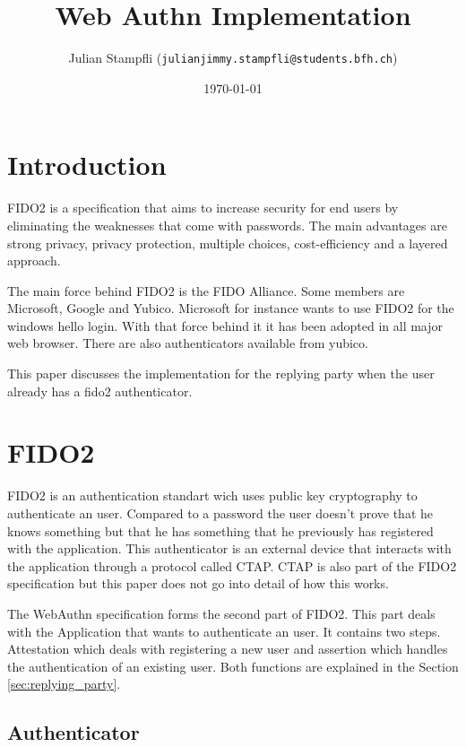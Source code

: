 \documentclass[a4paper, 11pt]{scrartcl}
\begin{document}
\title{Web Authn Implementation}
\date{\today} 
\author{ Julian Stampfli (\texttt{julianjimmy.stampfli@students.bfh.ch}) }
\maketitle
\setcounter{tocdepth}{2}
\tableofcontents
\clearpage

\section{Introduction}

FIDO2 is a specification that aims to increase security for end users by eliminating the weaknesses that come with passwords. The main advantages are strong privacy, privacy protection, multiple choices, cost-efficiency and a layered approach. \cite{yubico:whatIsFido2} 

The main force behind FIDO2 is the FIDO Alliance. Some members are Microsoft, Google and Yubico. Microsoft for instance wants to use FIDO2 for the windows hello login. \cite{yubico:ms} With that force behind it it has been adopted in all major web browser. \cite{fido:browser} There are also authenticators available from yubico. \cite{yubico:yubikey5}

This paper discusses the implementation for the replying party when the user already has a fido2 authenticator.

\section{FIDO2}

FIDO2 is an authentication standart wich uses public key cryptography to authenticate an user. Compared to a password the user doesn't prove that he knows something but that he has something that he previously has registered with the application. This authenticator is an external device that interacts with the application through a protocol called CTAP. CTAP is also part of the FIDO2 specification but this paper does not go into detail of how this works. \cite{ctap}

The WebAuthn specification forms the second part of FIDO2. This part deals with the Application that wants to authenticate an user. It contains two steps. Attestation which deals with registering a new user and assertion which handles the authentication of an existing user. Both functions are explained in the Section \ref{sec:replying_party}.

\subsection{Authenticator}
\end{document}
